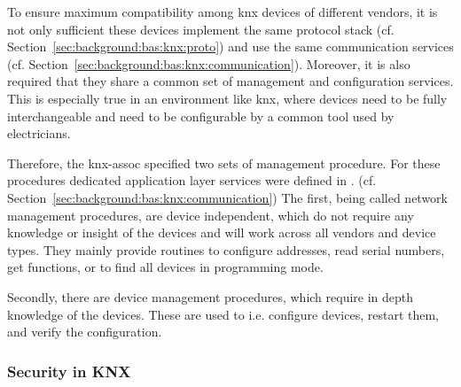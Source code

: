 To ensure maximum compatibility among \gls{knx} devices of different vendors, it is not only sufficient these devices implement the same protocol stack (cf. Section~\ref{sec:background:bas:knx:proto}) and use the same communication services (cf. Section~\ref{sec:background:bas:knx:communication}).
Moreover, it is also required that they share a common set of management and configuration services.
This is especially true in an environment like \gls{knx}, where devices need to be fully interchangeable and need to be configurable by a common tool used by electricians.

Therefore, the \gls{knx-assoc} specified two sets of management procedure.
For these procedures dedicated application layer services were defined in \textcite{DIN_EN_50090-4-1}. (cf. Section~\ref{sec:background:bas:knx:communication})
The first, being called network management procedures, are device independent, which do not require any knowledge or insight of the devices and will work across all vendors and device types. \parencite[pp.~11~ff.]{DIN_EN_50090-7-1}
They mainly provide routines to configure addresses, read serial numbers, get functions, or to find all devices in programming mode.

Secondly, there are device management procedures, which require in depth knowledge of the devices. \parencite[pp.~30~ff.]{DIN_EN_50090-7-1}
These are used to i.e. configure devices, restart them, and verify the configuration.

\newpage
\subsubsection{Security in KNX}
\label{sec:background:bas:knx:security}

